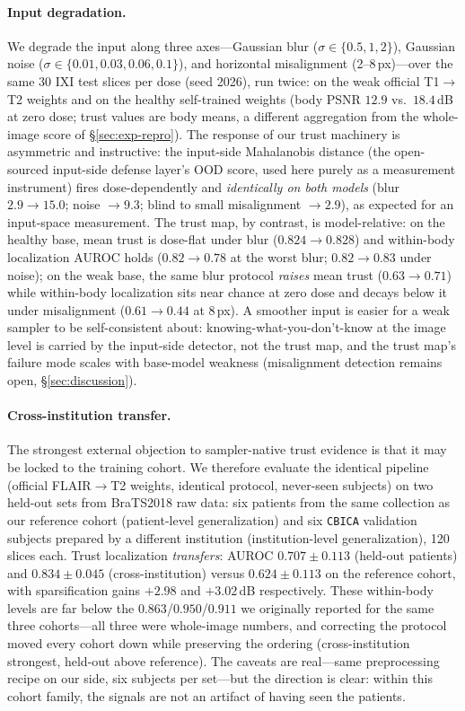 \documentclass[11pt]{article}
\begin{document}
\paragraph{Input degradation.}
We degrade the input along three axes---Gaussian blur ($\sigma\in\{0.5,1,2\}$),
Gaussian noise ($\sigma\in\{0.01,0.03,0.06,0.1\}$), and horizontal misalignment
(2--8\,px)---over the same 30 IXI test slices per dose (seed 2026), run twice:
on the weak official T1$\to$T2 weights and on the healthy self-trained weights
(body PSNR $12.9$ vs.\ $18.4$\,dB at zero dose; trust values are body means, a different
aggregation from the whole-image score of \S\ref{sec:exp-repro}). The
response of our trust machinery is asymmetric and instructive: the input-side
Mahalanobis distance (the open-sourced input-side defense layer's OOD score,
used here purely as a measurement instrument) fires dose-dependently and
\emph{identically on both models} (blur $2.9\to15.0$; noise
$\to9.3$; blind to small misalignment $\to2.9$), as expected for an
input-space measurement. The trust map, by contrast, is model-relative: on
the healthy base, mean trust is dose-flat under blur
($0.824\to0.828$) and within-body localization AUROC holds
($0.82\to0.78$ at the worst blur; $0.82\to0.83$ under noise); on the weak
base, the same blur protocol \emph{raises} mean trust
($0.63\to0.71$) while within-body localization sits near
chance at zero dose and decays below it under misalignment
($0.61\to0.44$ at 8\,px). A smoother input is easier for a weak
sampler to be self-consistent about: knowing-what-you-don't-know at the
image level is carried by the input-side detector, not the trust map, and
the trust map's failure mode scales with base-model weakness (misalignment
detection remains open, \S\ref{sec:discussion}).
\paragraph{Cross-institution transfer.}
The strongest external objection to sampler-native trust evidence is that it
may be locked to the training cohort. We therefore evaluate the identical
pipeline (official FLAIR$\to$T2 weights, identical protocol, never-seen
subjects) on two held-out sets from BraTS2018 raw data: six patients from the
same collection as our reference cohort (patient-level generalization) and six
\texttt{CBICA} validation subjects prepared by a different institution
(institution-level generalization), 120 slices each. Trust localization
\emph{transfers}: AUROC $0.707\pm0.113$ (held-out patients) and
$0.834\pm0.045$ (cross-institution) versus $0.624\pm0.113$ on the reference
cohort, with sparsification gains $+2.98$ and $+3.02$\,dB respectively.
These within-body levels are far below the $0.863$/$0.950$/$0.911$ we
originally reported for the same three cohorts---all three were whole-image
numbers, and correcting the protocol moved every cohort down while preserving
the ordering (cross-institution strongest, held-out above reference). The
caveats are real---same preprocessing recipe on our side, six subjects per
set---but the direction is clear: within this cohort family, the signals are
not an artifact of having seen the patients.
\end{document}
